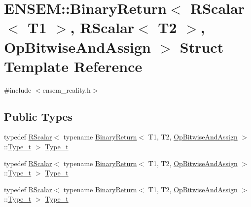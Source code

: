 \hypertarget{structENSEM_1_1BinaryReturn_3_01RScalar_3_01T1_01_4_00_01RScalar_3_01T2_01_4_00_01OpBitwiseAndAssign_01_4}{}\section{E\+N\+S\+EM\+:\+:Binary\+Return$<$ R\+Scalar$<$ T1 $>$, R\+Scalar$<$ T2 $>$, Op\+Bitwise\+And\+Assign $>$ Struct Template Reference}
\label{structENSEM_1_1BinaryReturn_3_01RScalar_3_01T1_01_4_00_01RScalar_3_01T2_01_4_00_01OpBitwiseAndAssign_01_4}


{\ttfamily \#include $<$ensem\+\_\+reality.\+h$>$}

\subsection*{Public Types}
\begin{DoxyCompactItemize}
\item 
typedef \mbox{\hyperlink{classENSEM_1_1RScalar}{R\+Scalar}}$<$ typename \mbox{\hyperlink{structENSEM_1_1BinaryReturn}{Binary\+Return}}$<$ T1, T2, \mbox{\hyperlink{structENSEM_1_1OpBitwiseAndAssign}{Op\+Bitwise\+And\+Assign}} $>$\+::\mbox{\hyperlink{structENSEM_1_1BinaryReturn_3_01RScalar_3_01T1_01_4_00_01RScalar_3_01T2_01_4_00_01OpBitwiseAndAssign_01_4_a465f70838ae6baf7c8bf08d58bd95cfa}{Type\+\_\+t}} $>$ \mbox{\hyperlink{structENSEM_1_1BinaryReturn_3_01RScalar_3_01T1_01_4_00_01RScalar_3_01T2_01_4_00_01OpBitwiseAndAssign_01_4_a465f70838ae6baf7c8bf08d58bd95cfa}{Type\+\_\+t}}
\item 
typedef \mbox{\hyperlink{classENSEM_1_1RScalar}{R\+Scalar}}$<$ typename \mbox{\hyperlink{structENSEM_1_1BinaryReturn}{Binary\+Return}}$<$ T1, T2, \mbox{\hyperlink{structENSEM_1_1OpBitwiseAndAssign}{Op\+Bitwise\+And\+Assign}} $>$\+::\mbox{\hyperlink{structENSEM_1_1BinaryReturn_3_01RScalar_3_01T1_01_4_00_01RScalar_3_01T2_01_4_00_01OpBitwiseAndAssign_01_4_a465f70838ae6baf7c8bf08d58bd95cfa}{Type\+\_\+t}} $>$ \mbox{\hyperlink{structENSEM_1_1BinaryReturn_3_01RScalar_3_01T1_01_4_00_01RScalar_3_01T2_01_4_00_01OpBitwiseAndAssign_01_4_a465f70838ae6baf7c8bf08d58bd95cfa}{Type\+\_\+t}}
\item 
typedef \mbox{\hyperlink{classENSEM_1_1RScalar}{R\+Scalar}}$<$ typename \mbox{\hyperlink{structENSEM_1_1BinaryReturn}{Binary\+Return}}$<$ T1, T2, \mbox{\hyperlink{structENSEM_1_1OpBitwiseAndAssign}{Op\+Bitwise\+And\+Assign}} $>$\+::\mbox{\hyperlink{structENSEM_1_1BinaryReturn_3_01RScalar_3_01T1_01_4_00_01RScalar_3_01T2_01_4_00_01OpBitwiseAndAssign_01_4_a465f70838ae6baf7c8bf08d58bd95cfa}{Type\+\_\+t}} $>$ \mbox{\hyperlink{structENSEM_1_1BinaryReturn_3_01RScalar_3_01T1_01_4_00_01RScalar_3_01T2_01_4_00_01OpBitwiseAndAssign_01_4_a465f70838ae6baf7c8bf08d58bd95cfa}{Type\+\_\+t}}
\end{DoxyCompactItemize}


